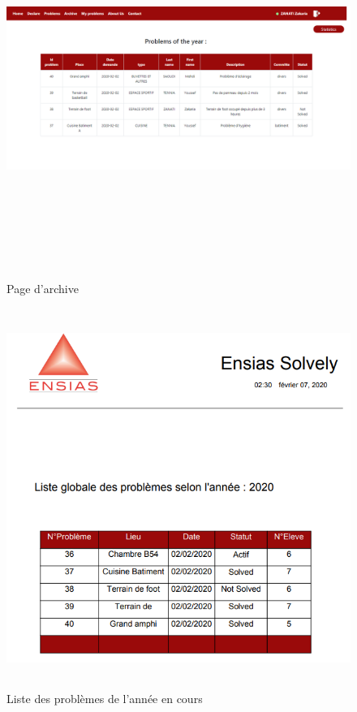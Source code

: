 \documentclass[11.5pt]{report}
\begin{document}
\newpage
\begin{figure}[h]
	
	\begin{center}
		\includegraphics[width=500pt,height=350pt]{archive.png} 
		\caption{Page d'archive}
	\end{center}
	
\end{figure}
\newpage
\begin{figure}[h]
	
	\begin{center}
		\includegraphics[width=500pt,height=350pt]{listproblems.png} 
		\caption{Liste des problèmes de l'année en cours}
	\end{center}
	
\end{figure}
\end{document}

